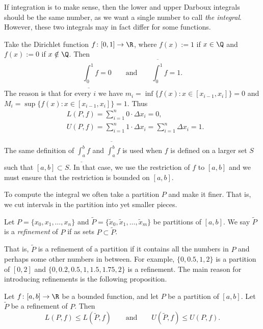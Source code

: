 \documentclass[12pt]{book}
\begin{document}
If integration is to make sense, then the lower and upper Darboux
integrals should be the same number, as we want a single number to call
\emph{the integral}.
However, these two integrals may in fact differ for
some functions.

\begin{example}
Take the Dirichlet function $f \colon [0,1] \to \R$, where $f(x) := 1$ if
$x \in \Q$ and $f(x) := 0$ if $x \notin \Q$.
Then
\begin{equation*}
\underline{\int_0^1} f = 0 \qquad \text{and} \qquad
\overline{\int_0^1} f = 1 .
\end{equation*}
The reason is that for every $i$ we have 
$m_i = \inf \{ f(x) : x \in [x_{i-1},x_i] \} = 0$  and
$M_i = \sup \{ f(x) : x \in [x_{i-1},x_i] \} = 1$.
Thus
\begin{align*}
& L(P,f) = \sum_{i=1}^n 0 \cdot \Delta x_i = 0 , \\
& U(P,f) = \sum_{i=1}^n 1 \cdot \Delta x_i = \sum_{i=1}^n \Delta x_i = 1  .
\end{align*}
\end{example}

\begin{remark}
The same definition of $\underline{\int_a^b} f$ and
$\overline{\int_a^b} f$
is used when $f$ is defined on a larger set $S$ such that
$[a,b] \subset S$.
In that case, we use the restriction of $f$ to $[a,b]$
and we must ensure that the restriction is bounded on $[a,b]$.
\end{remark}

To compute the integral we often take a partition $P$ and make it finer.
That is, we cut intervals in the partition into yet smaller pieces.

\begin{defn}
Let $P = \{ x_0, x_1, \ldots, x_n \}$ and
$\widetilde{P} = \{ \widetilde{x}_0, \widetilde{x}_1, \ldots, \widetilde{x}_m \}$ be
partitions of $[a,b]$.
We say $\widetilde{P}$ is a
\emph{refinement} of $P$
if as sets $P \subset \widetilde{P}$.
\end{defn}

That is, $\widetilde{P}$ is a refinement of a partition if it contains all the
numbers in $P$ and perhaps some other numbers in between.
For example,
$\{ 0, 0.5, 1, 2 \}$ is a partition of $[0,2]$ and
$\{ 0, 0.2, 0.5, 1, 1.5, 1.75, 2 \}$ is a refinement.
The main reason for introducing refinements is the following proposition.

\begin{prop} \label{prop:refinement}
Let $f \colon [a,b] \to \R$ be a bounded function, and let $P$
be a partition of $[a,b]$.
Let $\widetilde{P}$ be a refinement of $P$.
Then
\begin{equation*}
L(P,f) \leq L(\widetilde{P},f) 
\qquad \text{and} \qquad
U(\widetilde{P},f) \leq U(P,f) .
\end{equation*}
\end{prop}
\end{document}
